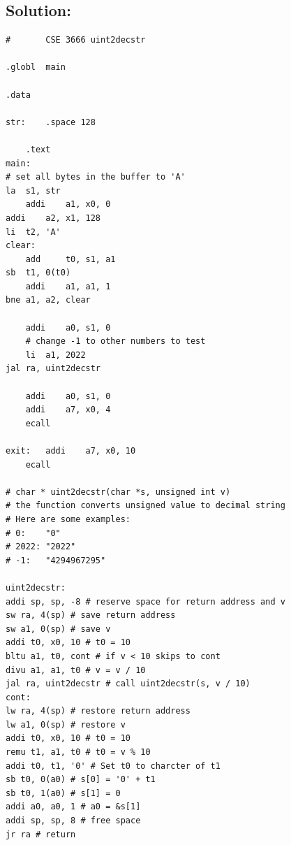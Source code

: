 \documentclass{article}
\begin{document}
\subsection*{Solution:}
\begin{lstlisting}
#       CSE 3666 uint2decstr

.globl  main

.data

str:	.space 128

    .text
main:   
# set all bytes in the buffer to 'A'
la	s1, str
    addi    a1, x0, 0
addi	a2, x1, 128
li	t2, 'A'
clear:
    add     t0, s1, a1
sb	t1, 0(t0)
    addi    a1, a1, 1
bne	a1, a2, clear

    addi    a0, s1, 0
    # change -1 to other numbers to test
    li	a1, 2022
jal	ra, uint2decstr

    addi    a0, s1, 0
    addi    a7, x0, 4
    ecall

exit:   addi    a7, x0, 10      
    ecall

# char * uint2decstr(char *s, unsigned int v) 
# the function converts unsigned value to decimal string
# Here are some examples:
# 0:    "0"
# 2022: "2022"
# -1:   "4294967295"

uint2decstr:
addi sp, sp, -8 # reserve space for return address and v
sw ra, 4(sp) # save return address
sw a1, 0(sp) # save v
addi t0, x0, 10 # t0 = 10
bltu a1, t0, cont # if v < 10 skips to cont
divu a1, a1, t0 # v = v / 10
jal ra, uint2decstr # call uint2decstr(s, v / 10)
cont:
lw ra, 4(sp) # restore return address
lw a1, 0(sp) # restore v
addi t0, x0, 10 # t0 = 10
remu t1, a1, t0 # t0 = v % 10
addi t0, t1, '0' # Set t0 to charcter of t1
sb t0, 0(a0) # s[0] = '0' + t1
sb t0, 1(a0) # s[1] = 0
addi a0, a0, 1 # a0 = &s[1]
addi sp, sp, 8 # free space
jr ra # return
\end{lstlisting}
\end{document}
